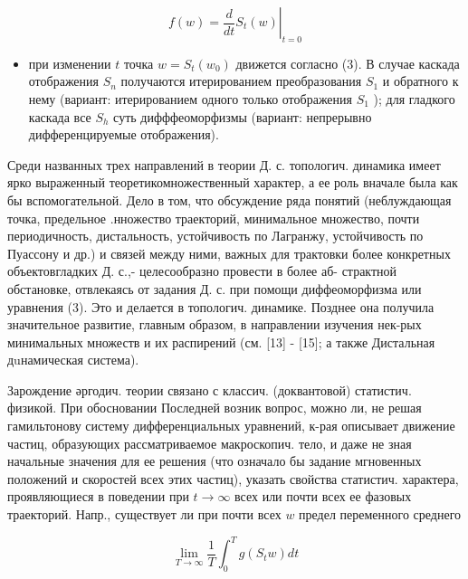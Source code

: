 \documentclass[10pt]{article}
\begin{document}
\[

f(w)=\left.\frac{d}{d t} S_{t}(w)\right|_{t=0}

\]



\begin{itemize}

  \item при изменении $t$ точка $w=S_{t}\left(w_{0}\right)$ движется согласно (3). В случае каскада отображения $S_{n}$ получаются итерированием преобразования $S_{1}$ и обратного к нему (вариант: итерированием одного только отображения $S_{1}$ ); для гладкого каскада все $S_{h}$ суть дифффеоморфизмы (вариант: непрерывно дифференцируемые отображения).

\end{itemize}



Среди названных трех направлений в теории Д. с. топологич. динамика имеет ярко выраженный теоретикомножественный характер, а ее роль вначале была как бы вспомогательной. Дело в том, что обсуждение ряда понятий (неблуждающая точка, предельное .нножество траекторий, минимальное множество, почти периодичность, дистальность, устойчивость по Лагранжу, устойчивость по Пуассону и др.) и связей между ними, важных для трактовки более конкретных объектовгладких Д. с.,- целесообразно провести в более аб- страктной обстановке, отвлекаясь от задания Д. с. при помощи диффеоморфизма или уравнения (3). Это и делается в топологич. динамике. Позднее она получила значительное развитие, главным образом, в направлении изучения нек-рых минимальных множеств и их распирений (см. [13] - [15]; а также Дистальная дuнамическая система).



Зарождение әргодич. теории связано с классич. (доквантовой) статистич. физикой. При обосновании Последней возник вопрос, можно ли, не решая гамильтонову систему дифференциальных уравнений, к-рая описывает движение частиц, образующих рассматриваемое макроскопич. тело, и даже не зная начальные значения для ее решения (что означало бы задание мгновенных положений и скоростей всех этих частиц), указать свойства статистич. характера, проявляющиеся в поведении при $t \rightarrow \infty$ всех или почти всех ее фазовых траекторий. Напр., существует ли при почти всех $w$ предел переменного среднего



\[

\lim _{T \rightarrow \infty} \frac{1}{T} \int_{0}^{T} g\left(S_{t} w\right) d t

\]
\end{document}
